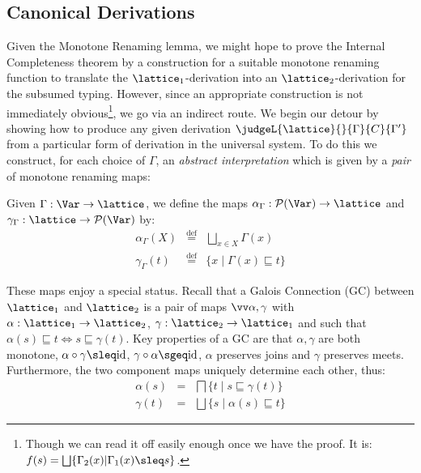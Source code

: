 \documentclass{sigplanconf}
\newcommand{\pset}{\mathcal{P}}
\newcommand{\eqdef}{\mathrel{\stackrel{{\scriptscriptstyle\mathrm{def}}}{=}}}
\begin{document}
\subsection{Canonical Derivations}
Given the Monotone Renaming lemma, we might hope to prove the
Internal Completeness theorem by a construction for a suitable
monotone renaming function to translate the $\lattice_1$-derivation
into an $\lattice_2$-derivation for the subsumed typing. However,
since an appropriate construction is not immediately obvious\footnote{Though we can read it off easily enough once we have the proof. It is:
$f(s) = \bigsqcup\{\Gamma_2(x) | \Gamma_1(x) \sleq s\}$.}, we go via an indirect route.
We begin our detour by showing how to produce any given derivation
$\judgeL{\lattice}{}{\Gamma}{C}{\Gamma'}$
from a particular form of 
derivation in the universal system. To do this
we construct, for each choice of $\Gamma$, an \emph{abstract interpretation} 
 \cite{Cousot:Cousot:Abstract:Interpretation} which is given by 
a \emph{pair} of monotone renaming maps:
\begin{definition}
Given $\Gamma: \Var \rightarrow \lattice$, we define the maps
$\alpha_\Gamma : \pset(\Var) \rightarrow \lattice$
and
$\gamma_\Gamma : \lattice \rightarrow \pset(\Var)$
by:
\begin{eqnarray}
        \alpha_\Gamma(X) & \eqdef & \bigsqcup_{x \in X} \Gamma(x) \\
        \gamma_\Gamma(t) & \eqdef & \{ x \;|\; \Gamma(x) \sqsubseteq t \}
\end{eqnarray}
\end{definition}
These maps enjoy a special status.
Recall \cite{davey90introduction}
that a Galois Connection (GC) between $\lattice_1$ and $\lattice_2$
is a pair of maps $\vect{\alpha,\gamma}$ with
$\alpha: \lattice_1 \rightarrow \lattice_2$,
$\gamma: \lattice_2 \rightarrow \lattice_1$ and such that
$\alpha(s) \sqsubseteq t \iff s \sqsubseteq \gamma(t)$.
Key properties of a GC are that $\alpha, \gamma$ are both monotone,
$\alpha \circ \gamma \sleq \mathrm{id}$,
$\gamma \circ \alpha \sgeq \mathrm{id}$,
$\alpha$ preserves joins and $\gamma$ preserves meets.
Furthermore, the two component maps uniquely determine each other, thus:
\begin{eqnarray}
        \alpha(s) & = & \bigsqcap \{ t \;|\; s \sqsubseteq \gamma(t) \}
            \label{eqn:alpha} \\
        \gamma(t) & = & \bigsqcup \{ s \;|\; \alpha(s) \sqsubseteq t \}
            \label{eqn:gamma}
\end{eqnarray}
\end{document}
